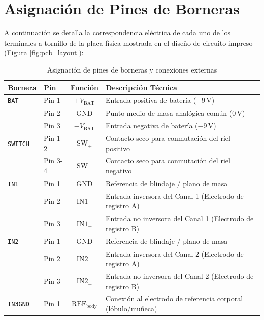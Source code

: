 \documentclass[10pt,a4paper]{article}
\begin{document}
\section{Asignación de Pines de Borneras}

A continuación se detalla la correspondencia eléctrica de cada uno de los terminales a tornillo de la placa física mostrada en el diseño de circuito impreso (Figura \ref{fig:pcb_layout}):

\begin{table}[H]
    \centering
    \small
    \caption{Asignación de pines de borneras y conexiones externas}
    \label{tab:pinout}
    \begin{tabular}{llcl}
        \toprule
        \textbf{Bornera} & \textbf{Pin} & \textbf{Función} & \textbf{Descripción Técnica} \\
        \midrule
        \texttt{BAT} & Pin 1 & $+V_{\text{BAT}}$ & Entrada positiva de batería ($+9\,\text{V}$) \\
                     & Pin 2 & $\text{GND}$ & Punto medio de masa analógica común ($0\,\text{V}$) \\
                     & Pin 3 & $-V_{\text{BAT}}$ & Entrada negativa de batería ($-9\,\text{V}$) \\
        \midrule
        \texttt{SWITCH}& Pin 1-2 & $\text{SW}_+$ & Contacto seco para conmutación del riel positivo \\
                       & Pin 3-4 & $\text{SW}_-$ & Contacto seco para conmutación del riel negativo \\
        \midrule
        \texttt{IN1} & Pin 1 & $\text{GND}$ & Referencia de blindaje / plano de masa \\
                     & Pin 2 & $\text{IN1}_-$ & Entrada inversora del Canal 1 (Electrodo de registro A) \\
                     & Pin 3 & $\text{IN1}_+$ & Entrada no inversora del Canal 1 (Electrodo de registro B) \\
        \midrule
        \texttt{IN2} & Pin 1 & $\text{GND}$ & Referencia de blindaje / plano de masa \\
                     & Pin 2 & $\text{IN2}_-$ & Entrada inversora del Canal 2 (Electrodo de registro A) \\
                     & Pin 3 & $\text{IN2}_+$ & Entrada no inversora del Canal 2 (Electrodo de registro B) \\
        \midrule
        \texttt{IN3GND}& Pin 1 & $\text{REF}_{\text{body}}$ & Conexión al electrodo de referencia corporal (lóbulo/muñeca) \\

\end{tabular}
\end{table}
\end{document}
